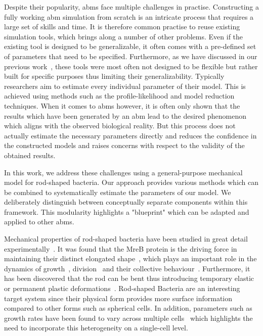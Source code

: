 \documentclass{article}
\begin{document}
Despite their popularity, \acp{abm} face multiple challenges in practise.
Constructing a fully working \ac{abm} simulation from scratch is an intricate process that requires
a large set of skills and time.
It is therefore common practise to reuse existing simulation tools, which brings along a number of
other problems.
Even if the existing tool is designed to be generalizable, it often comes with a pre-defined set
of parameters that need to be specified.
Furthermore, as we have discussed in our previous work~\cite{Pleyer2023}, these tools were most
often not designed to be flexible but rather built for specific purposes thus limiting their
generalizability.
Typically researchers aim to estimate every individual parameter of their model.
This is achieved using methods such as the profile-likelihood and model reduction techniques.
When it comes to \acp{abm} however, it is often only shown that the results which have been
generated by an \ac{abm} lead to the desired phenomenon which aligns with the observed biological
reality.
But this process does not actually estimate the necessary parameters directly
and reduces the confidence in the constructed models and raises concerns with respect to the
validity of the obtained results.

In this work, we address these challenges using a general-purpose mechanical model for rod-shaped
bacteria.
Our approach provides various methods which can be combined to systematically estimate the
parameters of our model.
We deliberately distinguish between conceptually separate components within this framework.
This modularity highlights a "blueprint" which can be adapted and applied to other \acp{abm}.

Mechanical properties of rod-shaped bacteria have been studied in great detail
experimentally~\cite{Chatterjee1988,Takeuchi2005,IWAI2002}.
It was found that the MreB protein is the driving force in maintaining their distinct elongated
shape~\cite{Ursell2014}, which plays an important role in the dynamics of
growth~\cite{Billaudeau2017}, division~\cite{Harry2001} and their collective
behaviour~\cite{vanGestel2015,Balagam2015}.
Furthermore, it has been discovered that the rod can be bent thus introducing temporary elastic or
permanent plastic deformations~\cite{Amir2014_2}.
Rod-shaped Bacteria are an interesting target system since their physical form provides more surface
information compared to other forms such as spherical cells.
In addition, parameters such as growth rates have been found to vary across multiple
cells~\cite{Koutsoumanis2013} which highlights the need to incorporate this heterogeneity on a
single-cell level.
\end{document}
